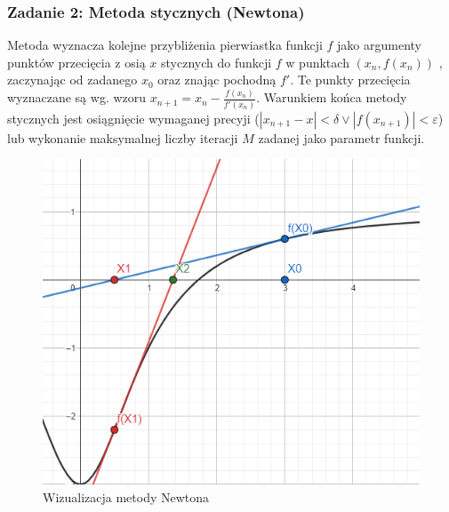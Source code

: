 \documentclass[11pt]{article}
\begin{document}
        \subsubsection*{Zadanie 2: Metoda stycznych (Newtona)}
            Metoda wyznacza kolejne przybliżenia pierwiastka funkcji $f$ jako argumenty punktów przecięcia z osią $x$ 
            stycznych do funkcji $f$ w punktach $(x_n, f(x_n))$ , zaczynając od zadanego $x_0$ oraz znając pochodną $f'$. 
            Te punkty przecięcia wyznaczane są wg. wzoru $x_{n + 1} = x_n - \frac{f(x_n)}{f'(x_n)}$. Warunkiem 
            końca metody stycznych jest osiągnięcie wymaganej precyji ($|x_{n + 1} - x| < \delta \lor |f(x_{n + 1})| < \varepsilon$) 
            lub wykonanie maksymalnej liczby iteracji $M$ zadanej jako parametr funkcji.
            \newline
            \begin{figure}[h]
                \centering
                \includegraphics[scale=0.6]{img/tangent.png}
                \caption{Wizualizacja metody Newtona}
                \label{fig:tangent}
            \end{figure}
\end{document}
